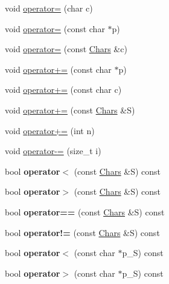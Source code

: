 \begin{DoxyCompactItemize}
\item 
void \hyperlink{class_chars_a2b97e570d390e26355d33a7614054deb}{operator=} (char c)
\item 
void \hyperlink{class_chars_a689d1b39a732aa7f66666b6838704e75}{operator=} (const char $\ast$p)
\item 
void \hyperlink{class_chars_ae6e29c446c8d24871e5b88735c50b9ad}{operator=} (const \hyperlink{class_chars}{Chars} \&c)
\item 
void \hyperlink{class_chars_a35b77dcb601f6e9986b9a90cd0e0777d}{operator+=} (const char $\ast$p)
\item 
void \hyperlink{class_chars_a97610b43192df947bfb5171aa4f6bce9}{operator+=} (const char c)
\item 
void \hyperlink{class_chars_a226b26a4372bc2d4a0ef1f65ec50679e}{operator+=} (const \hyperlink{class_chars}{Chars} \&S)
\item 
void \hyperlink{class_chars_aac39999e26b0b895304fbc4a2e192b12}{operator+=} (int n)
\item 
void \hyperlink{class_chars_ad11df8a7e3ebfef39dd49aa19ab5b40b}{operator-\/=} (size\+\_\+t i)
\item 
\hypertarget{class_chars_a869866269638958aa2e53ff7376ee373}{}bool {\bfseries operator$<$} (const \hyperlink{class_chars}{Chars} \&S) const \label{class_chars_a869866269638958aa2e53ff7376ee373}

\item 
\hypertarget{class_chars_ac49ec07ec3525dc3ba4c41172626e291}{}bool {\bfseries operator$>$} (const \hyperlink{class_chars}{Chars} \&S) const \label{class_chars_ac49ec07ec3525dc3ba4c41172626e291}

\item 
\hypertarget{class_chars_a171c80714e82f5205d3407fa98252194}{}bool {\bfseries operator==} (const \hyperlink{class_chars}{Chars} \&S) const \label{class_chars_a171c80714e82f5205d3407fa98252194}

\item 
\hypertarget{class_chars_a40f7d810b7572ad57348c02414384616}{}bool {\bfseries operator!=} (const \hyperlink{class_chars}{Chars} \&S) const \label{class_chars_a40f7d810b7572ad57348c02414384616}

\item 
\hypertarget{class_chars_af60a0632d5261c0d68a90d48e6fc2f1f}{}bool {\bfseries operator$<$} (const char $\ast$p\+\_\+\+S) const \label{class_chars_af60a0632d5261c0d68a90d48e6fc2f1f}

\item 
\hypertarget{class_chars_a674190b0cf3932c7724118177ad47333}{}bool {\bfseries operator$>$} (const char $\ast$p\+\_\+\+S) const \label{class_chars_a674190b0cf3932c7724118177ad47333}


\end{DoxyCompactItemize}
